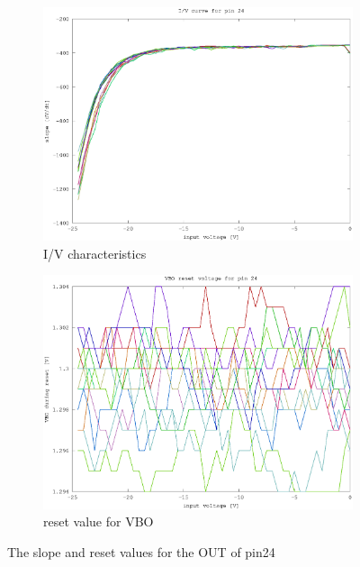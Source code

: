 \documentclass{article}
\begin{document}
\begin{figure}[h]
	\centering
	\begin{subfigure}[b]{0.475\textwidth}
	    \centering
	    \includegraphics[width=\textwidth]{fig/pin24_slope_-25-0V.eps}
	    \caption[Network2]%
	    {I/V characteristics}    
	    \label{fig:pin24_slope}
	\end{subfigure}
	\hfill
	\begin{subfigure}[b]{0.475\textwidth}  
	    \centering 
	    \includegraphics[width=\textwidth]{fig/pin24_reset_-25-0V.eps}
	    \caption[]%
	    {reset value for VBO}    
	    \label{fig:pin24_reset}
	\end{subfigure}
	\caption{The slope and reset values for the OUT of pin24}
	\label{fig:pin32}
\end{figure}
\end{document}
